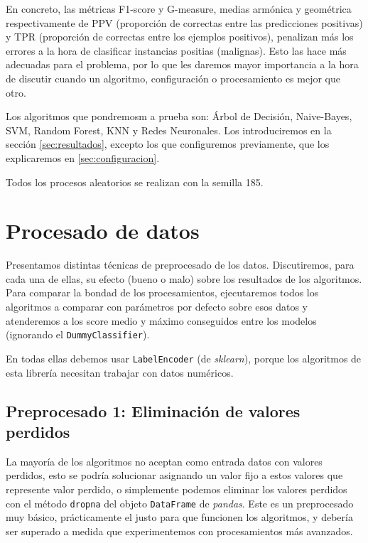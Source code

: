 \documentclass{article}
\begin{document}
En concreto, las métricas F1-score y G-measure, medias armónica y
geométrica respectivamente de PPV (proporción de correctas entre las
predicciones positivas) y TPR (proporción de correctas entre los
ejemplos positivos), penalizan más los errores a la hora de clasificar
instancias positias (malignas). Esto las hace más adecuadas para el
problema, por lo que les daremos mayor importancia a la hora de
discutir cuando un algoritmo, configuración o procesamiento es mejor
que otro.

Los algoritmos que pondremosm a prueba son: Árbol de Decisión,
Naive-Bayes, SVM, Random Forest, KNN y Redes Neuronales. Los
introduciremos en la sección \ref{sec:resultados}, excepto los que
configuremos previamente, que los explicaremos en
\ref{sec:configuracion}.

Todos los procesos aleatorios se realizan con la semilla 185.

\section{Procesado de datos}

Presentamos distintas técnicas de preprocesado de los
datos. Discutiremos, para cada una de ellas, su efecto (bueno o malo)
sobre los resultados de los algoritmos. Para comparar la bondad de los
procesamientos, ejecutaremos todos los algoritmos a comparar con
parámetros por defecto sobre esos datos y atenderemos a los score
medio y máximo conseguidos entre los modelos (ignorando el
\texttt{DummyClassifier}).

En todas ellas debemos usar \texttt{LabelEncoder} (de
\textit{sklearn}), porque los algoritmos de esta librería necesitan
trabajar con datos numéricos.

\subsection{Preprocesado 1: Eliminación de valores perdidos}

La mayoría de los algoritmos no aceptan como entrada datos con valores
perdidos, esto se podría solucionar asignando un valor fijo a estos
valores que represente valor perdido, o simplemente podemos eliminar
los valores perdidos con el método \texttt{dropna} del objeto
\texttt{DataFrame} de \textit{pandas}. Este es un preprocesado muy
básico, prácticamente el justo para que funcionen los algoritmos, y
debería ser superado a medida que experimentemos con procesamientos
más avanzados.
\end{document}
